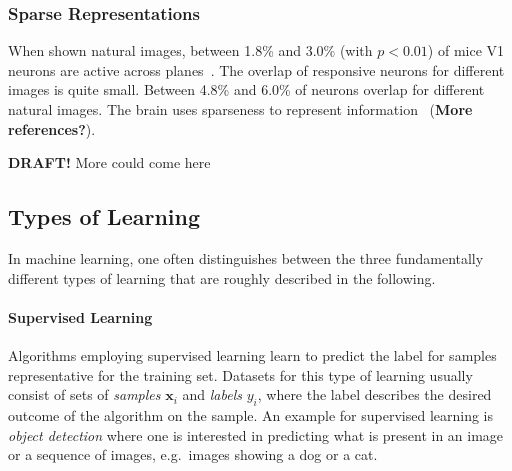 \subsubsection{Sparse Representations}\label{subsubsec:sparse_representations}

When shown natural images, between 1.8\% and 3.0\% (with $p < 0.01$) of mice \ac{V1} neurons are active across planes~\citep{yoshida2020natural}.
The overlap of responsive neurons for different images is quite small.
Between 4.8\% and 6.0\% of neurons overlap for different natural images.
The brain uses sparseness to represent information~\citep{yoshida2020natural} (\textbf{More references?}).

\textbf{DRAFT!} More could come here

\subsection{Types of Learning}\label{subsec:types-of-learning}

In machine learning, one often distinguishes between the three fundamentally different types of learning that are roughly described in the following.

\paragraph{Supervised Learning}
Algorithms employing supervised learning learn to predict the label for samples representative for the training set.
Datasets for this type of learning usually consist of sets of \textit{samples} $\bm{x}_i$ and \textit{labels} $y_i$, where the label describes the desired outcome of the algorithm on the sample.
An example for supervised learning is \textit{object detection} where one is interested in predicting what is present in an image or a sequence of images, e.g.~images showing a dog or a cat.

